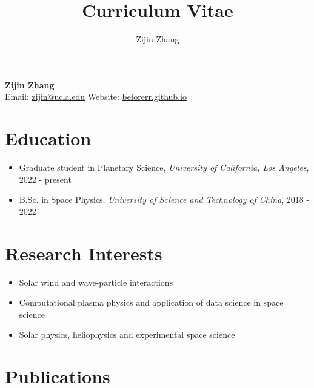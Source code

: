 \documentclass[
  letterpaper,
  DIV=11,
  numbers=noendperiod]{scrartcl}
\title{Curriculum Vitae}
\author{Zijin Zhang}
\date{}
\begin{document}
\maketitle


\begin{center}
    \textbf{\Large Zijin Zhang} \\ \vspace{5pt}
    Email: \href{mailto:zijin@ucla.edu}{zijin@ucla.edu} \quad
    Website: \href{https://beforerr.github.io/beforerr/docs/research/}{beforerr.github.io}
\end{center}

\section{Education}\label{education}

\begin{itemize}
\item
  Graduate student in Planetary Science, \emph{University of California, Los Angeles}, 2022 - present
\item
  B.Sc. in Space Physics, \emph{University of Science and Technology of China}, 2018 - 2022
\end{itemize}

\section{Research Interests}\label{research-interests}

\begin{itemize}
\item
  Solar wind and wave‑particle interactions
\item
  Computational plasma physics and application of data science in space science
\item
  Solar physics, heliophysics and experimental space science
\end{itemize}

\section{Publications}\label{publications}
\end{document}
